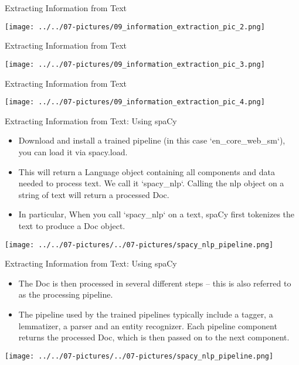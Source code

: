 \documentclass[11pt]{beamer}
\begin{document}
\begin{frame}{Extracting Information from Text}
	\begin{center}
	\texttt{[image: ../../07-pictures/09\_information\_extraction\_pic\_2.png]}
	\end{center}
\end{frame}
\begin{frame}{Extracting Information from Text}
	\begin{center}
	\texttt{[image: ../../07-pictures/09\_information\_extraction\_pic\_3.png]}
	\end{center}
\end{frame}
\begin{frame}{Extracting Information from Text}
	\begin{center}
	\texttt{[image: ../../07-pictures/09\_information\_extraction\_pic\_4.png]}
	\end{center}
\end{frame}
\begin{frame}{Extracting Information from Text: Using spaCy}

\begin{itemize}
\item Download and install a trained pipeline (in this case `en\_core\_web\_sm`), you can load it via spacy.load. 
\item This will return a Language object containing all components and data needed to process text. We call it `spacy\_nlp`. Calling the nlp object on a string of text will return a processed Doc. 
\item In particular, When you call `spacy\_nlp` on a text, spaCy first tokenizes the text to produce a Doc object. 
\end{itemize}

	\begin{center}
	\texttt{[image: ../../07-pictures/../07-pictures/spacy\_nlp\_pipeline.png]}
	\end{center}
\end{frame}
\begin{frame}{Extracting Information from Text: Using spaCy}

\begin{itemize}
\item The Doc is then processed in several different steps – this is also referred to as the processing pipeline. 
\item The pipeline used by the trained pipelines typically include a tagger, a lemmatizer, a parser and an entity recognizer. Each pipeline component returns the processed Doc, which is then passed on to the next component.
\end{itemize}

	\begin{center}
	\texttt{[image: ../../07-pictures/../07-pictures/spacy\_nlp\_pipeline.png]}
	\end{center}
\end{frame}
\end{document}
